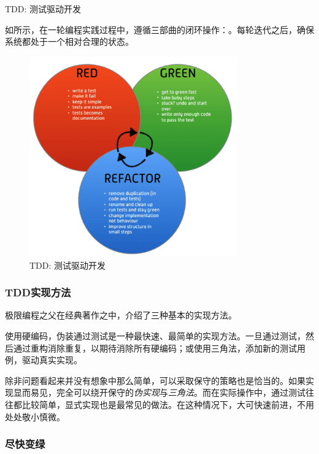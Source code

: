 \begin{content}
\begin{episode}{TDD: 测试驱动开发}
\begin{content}
如所示，在一轮编程实践过程中，遵循三部曲的闭环操作：。每轮迭代之后，确保系统都处于一个相对合理的状态。

\begin{figure}[H]
\centering
\includegraphics[width=0.8\textwidth]{figures/xunit/tdd-cycle.png}
\caption{TDD: 测试驱动开发}
 \label{fig:tdd-cycle}
\end{figure}

\subsubsection{TDD实现方法}

极限编程之父在经典著作之中，介绍了三种基本的实现方法。

\begin{enum}
\end{enum}

使用硬编码，伪装通过测试是一种最快速、最简单的实现方法。一旦通过测试，然后通过重构消除重复，以期待消除所有硬编码；或使用三角法，添加新的测试用例，驱动真实实现。

除非问题看起来并没有想象中那么简单，可以采取保守的策略也是恰当的。如果实现显而易见，完全可以绕开保守的\emph{伪实现}与\emph{三角法}。而在实际操作中，通过测试往往都比较简单，显式实现也是最常见的做法。在这种情况下，大可快速前进，不用处处敬小慎微。

\subsubsection{尽快变绿}


\end{content}
\end{episode}
\end{content}
